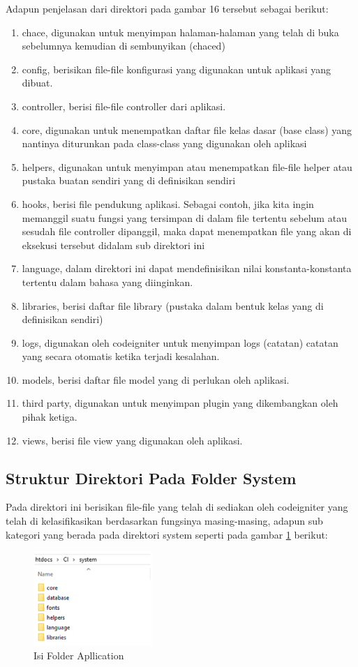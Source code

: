Adapun penjelasan dari direktori pada gambar 16 tersebut sebagai berikut:
\begin{enumerate}
\item chace, digunakan untuk menyimpan halaman-halaman yang telah di buka sebelumnya kemudian di sembunyikan (chaced)
\item	config, berisikan file-file konfigurasi yang digunakan untuk aplikasi yang dibuat.
\item controller, berisi file-file controller dari aplikasi.
\item core, digunakan untuk menempatkan daftar file kelas dasar (base class) yang nantinya diturunkan pada class-class yang digunakan oleh aplikasi 
\item helpers, digunakan untuk menyimpan atau menempatkan file-file helper atau pustaka buatan sendiri yang di definisikan sendiri
\item hooks, berisi file pendukung aplikasi. Sebagai contoh, jika kita ingin memanggil suatu fungsi yang tersimpan di dalam file tertentu sebelum atau sesudah file controller dipanggil, maka dapat menempatkan file yang akan di eksekusi tersebut didalam sub direktori ini 
\item language, dalam direktori ini dapat mendefinisikan nilai konstanta-konstanta tertentu dalam bahasa yang diinginkan.
\item libraries, berisi daftar file library (pustaka dalam bentuk kelas yang di definisikan sendiri)
\item logs, digunakan oleh codeigniter untuk menyimpan logs (catatan) catatan yang secara otomatis ketika terjadi kesalahan.
\item models, berisi daftar file model yang di perlukan oleh aplikasi.
\item third party, digunakan untuk menyimpan plugin yang dikembangkan oleh pihak ketiga.
\item views, berisi file view yang digunakan oleh aplikasi.
\end{enumerate}

	
\subsection{Struktur Direktori Pada Folder System}
Pada direktori ini berisikan file-file yang telah di sediakan oleh codeigniter yang telah di kelasifikasikan berdasarkan fungsinya masing-masing, adapun sub kategori yang berada pada direktori system seperti pada gambar \ref{C8} berikut:

\begin{figure}[!htbp]
	\centerline{\includegraphics[width=0.40\textwidth]{figures/ci/8.png}}
	\caption{Isi Folder Apllication}
	\label{C8}
\end{figure}

